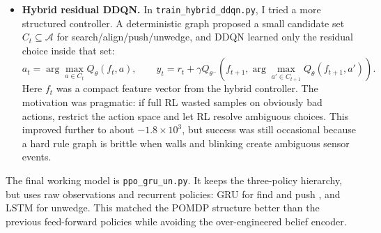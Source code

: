 \documentclass[11pt, oneside]{article}
\begin{document}
\begin{itemize}
    \item \textbf{Hybrid residual DDQN.} In \texttt{train\_hybrid\_ddqn.py}, I tried a more structured controller. A deterministic graph proposed a small candidate set \(C_t\subseteq\mathcal{A}\) for search/align/push/unwedge, and DDQN learned only the residual choice inside that set:
    \[
    a_t=\arg\max_{a\in C_t}Q_\theta(f_t,a),\qquad
    y_t=r_t+\gamma Q_{\theta^-}\!\left(f_{t+1},\arg\max_{a'\in C_{t+1}}Q_\theta(f_{t+1},a')\right).
    \]
    Here \(f_t\) was a compact feature vector from the hybrid controller. The motivation was pragmatic: if full RL wasted samples on obviously bad actions, restrict the action space and let RL resolve ambiguous choices. This improved further to about \(-1.8\times10^3\), but success was still occasional because a hard rule graph is brittle when walls and blinking create ambiguous sensor events.
\end{itemize}

The final working model is \texttt{ppo\_gru\_un.py}. It keeps the three-policy hierarchy, but uses raw observations and recurrent policies: GRU for find and push \citep{cho2014gru}, and LSTM for unwedge. This matched the POMDP structure better than the previous feed-forward policies while avoiding the over-engineered belief encoder.
\end{document}
